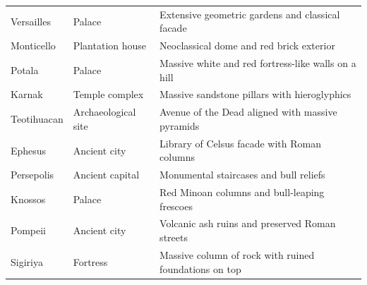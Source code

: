 \begin{table}[p]
\begin{tabular}{@{}p{}p{}p{}@{}}
\raggedright Versailles & \raggedright Palace & \raggedright Extensive geometric gardens and classical facade\tabularnewline
\raggedright Monticello & \raggedright Plantation house & \raggedright Neoclassical dome and red brick exterior\tabularnewline
\raggedright Potala & \raggedright Palace & \raggedright Massive white and red fortress-like walls on a hill\tabularnewline
\raggedright Karnak & \raggedright Temple complex & \raggedright Massive sandstone pillars with hieroglyphics\tabularnewline
\raggedright Teotihuacan & \raggedright Archaeological site & \raggedright Avenue of the Dead aligned with massive pyramids\tabularnewline
\raggedright Ephesus & \raggedright Ancient city & \raggedright Library of Celsus facade with Roman columns\tabularnewline
\raggedright Persepolis & \raggedright Ancient capital & \raggedright Monumental staircases and bull reliefs\tabularnewline
\raggedright Knossos & \raggedright Palace & \raggedright Red Minoan columns and bull-leaping frescoes\tabularnewline
\raggedright Pompeii & \raggedright Ancient city & \raggedright Volcanic ash ruins and preserved Roman streets\tabularnewline
\raggedright Sigiriya & \raggedright Fortress & \raggedright Massive column of rock with ruined foundations on top\tabularnewline
\bottomrule
\end{tabular}
\end{table}

